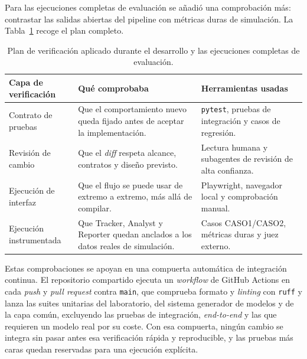 Para las ejecuciones completas de evaluación se añadió una comprobación más:
contrastar las salidas abiertas del pipeline con métricas duras de simulación.
La Tabla~\ref{tab:plan-verificacion-desarrollo} recoge el plan completo.

\begin{table}[H]
\begin{center}
\small
\setlength{\tabcolsep}{5pt}
\renewcommand{\arraystretch}{1.18}
\begin{tabular}{|>{\raggedright\arraybackslash}p{3.2cm}|>{\raggedright\arraybackslash}p{5.2cm}|>{\raggedright\arraybackslash}p{4.0cm}|} \hline
\textbf{Capa de verificación} & \textbf{Qué comprobaba} & \textbf{Herramientas usadas} \\ \hline
Contrato de pruebas & Que el comportamiento nuevo queda fijado antes de aceptar la implementación. & \texttt{pytest}, pruebas de integración y casos de regresión. \\ \hline
Revisión de cambio & Que el \textit{diff} respeta alcance, contratos y diseño previsto. & Lectura humana y subagentes de revisión de alta confianza. \\ \hline
Ejecución de interfaz & Que el flujo se puede usar de extremo a extremo, más allá de compilar. & Playwright, navegador local y comprobación manual. \\ \hline
Ejecución instrumentada & Que Tracker, Analyst y Reporter quedan anclados a los datos reales de simulación. & Casos CASO1/CASO2, métricas duras y juez externo. \\ \hline
\end{tabular}
\caption[Plan de verificación seguido durante el desarrollo]{Plan de
verificación aplicado durante el desarrollo y las ejecuciones completas de
evaluación.}
\label{tab:plan-verificacion-desarrollo}
\end{center}
\end{table}

Estas comprobaciones se apoyan en una compuerta automática de integración
continua. El repositorio compartido ejecuta un \textit{workflow} de GitHub
Actions en
cada \textit{push} y \textit{pull request} contra \texttt{main}, que comprueba
formato y \textit{linting} con \texttt{ruff} y lanza las suites unitarias del
laboratorio, del sistema generador de modelos y de la capa común, excluyendo las
pruebas de integración,
\textit{end-to-end} y las que requieren un modelo real por su coste. Con esa
compuerta, ningún cambio se integra sin pasar antes esa verificación rápida y
reproducible, y las pruebas más caras quedan reservadas para una ejecución
explícita.

